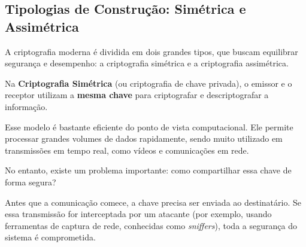 \documentclass[12pt,a4paper,twoside]{report}
\begin{document}
\subsection{Tipologias de Construção: Simétrica e Assimétrica}

A criptografia moderna é dividida em dois grandes tipos, que buscam equilibrar segurança e desempenho: a criptografia simétrica e a criptografia assimétrica.

Na \textbf{Criptografia Simétrica} (ou criptografia de chave privada), o emissor e o receptor utilizam a \textbf{mesma chave} para criptografar e descriptografar a informação.

Esse modelo é bastante eficiente do ponto de vista computacional. Ele permite processar grandes volumes de dados rapidamente, sendo muito utilizado em transmissões em tempo real, como vídeos e comunicações em rede.

No entanto, existe um problema importante: como compartilhar essa chave de forma segura?

Antes que a comunicação comece, a chave precisa ser enviada ao destinatário. Se essa transmissão for interceptada por um atacante (por exemplo, usando ferramentas de captura de rede, conhecidas como \textit{sniffers}), toda a segurança do sistema é comprometida.
\end{document}
